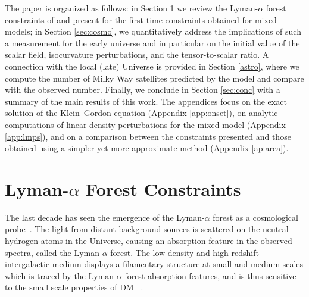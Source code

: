 \documentclass[11pt,nofootinbib]{article}
\numberwithin{equation}{section}
\begin{document}
The paper is organized as follows: in Section \ref{sec:lyman} we review the 
Lyman-$\alpha$ forest constraints of \cite{Irsic:2017yje} and present for the first time
constraints obtained for mixed models; in Section \ref{sec:cosmo}, we quantitatively address
the implications of such a measurement for the early universe and in particular on the initial 
value of the scalar field, isocurvature perturbations, and the tensor-to-scalar ratio. A connection
with the local (late) Universe is provided in Section \ref{astro}, where we compute the number
of Milky Way satellites predicted by the model and compare with the observed number.
Finally, we conclude in Section \ref{sec:conc} with a summary of the main results of this work.
The appendices focus on the exact solution of the Klein--Gordon equation
(Appendix \ref{app:onset}),
on analytic computations of linear density perturbations 
for the mixed model (Appendix \ref{app:lmps}),
and on a comparison between
the constraints presented and those obtained using a simpler yet more approximate method (Appendix \ref{ap:area}).


\section{Lyman-$\alpha$ Forest Constraints}
\label{sec:lyman}

The last decade has seen the emergence of the Lyman-$\alpha$ forest as a
cosmological probe~\cite{Mcquinn}. The light from distant
background sources is scattered on the neutral hydrogen atoms in the
Universe, causing an absorption feature in the observed
spectra, called the Lyman-$\alpha$ forest.  The low-density and
high-redshift intergalactic medium displays a filamentary structure at small and medium scales which is traced by the Lyman-$\alpha$ forest absorption features, and is thus
sensitive to the small scale properties of DM ~\cite{Viel:2013apy,Irsic:2017yje,Armengaud:2017nkf,Irsic:2017ixq,Baur:2017stq}.
\end{document}
